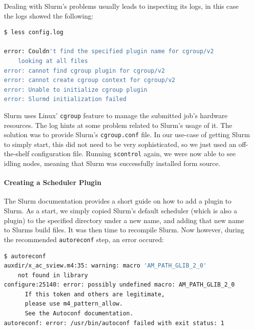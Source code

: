 Dealing with Slurm's problems usually leads to inspecting its logs, in this case the logs showed the following:

\begin{minipage}{\linewidth}
\begin{lstlisting}[language=bash, frame=single, numbers=none, caption={Slurm's cgroup configuration is missing according to the logs}, basicstyle=\ttfamily]
$ less config.log

error: Couldn't find the specified plugin name for cgroup/v2
    looking at all files
error: cannot find cgroup plugin for cgroup/v2
error: cannot create cgroup context for cgroup/v2
error: Unable to initialize cgroup plugin
error: Slurmd initialization failed
\end{lstlisting}
\end{minipage}

Slurm uses Linux' \verb|cgroup| feature to manage the submitted job's hardware resources. The log hints at some problem related to Slurm's usage of it.
The solution was to provide Slurm's \verb|cgroup.conf| file. In our use-case of getting Slurm to simply start, this did not need to be very sophisticated, so we just used an off-the-shelf configuration file.
Running \verb|scontrol| again, we were now able to see idling nodes, meaning that Slurm was successfully installed form source.

\paragraph{Creating a Scheduler Plugin}

The Slurm documentation provides a short guide on how to add a plugin to Slurm.
As a start, we simply copied Slurm's default scheduler (which is also a plugin) to the specified directory under a new name, and adding that new name to Slurms build files. 
It was then time to recompile Slurm. 
Now however, during the recommended \verb|autoreconf| step, an error occured:

\begin{minipage}{\linewidth}
\begin{lstlisting}[language=bash, frame=single, numbers=none, caption={Plugin recompilation errors}, basicstyle=\ttfamily]
$ autoreconf
auxdir/x_ac_sview.m4:35: warning: macro 'AM_PATH_GLIB_2_0' 
    not found in library
configure:25140: error: possibly undefined macro: AM_PATH_GLIB_2_0
      If this token and others are legitimate, 
      please use m4_pattern_allow.
      See the Autoconf documentation.
autoreconf: error: /usr/bin/autoconf failed with exit status: 1
\end{lstlisting}
\end{minipage}

